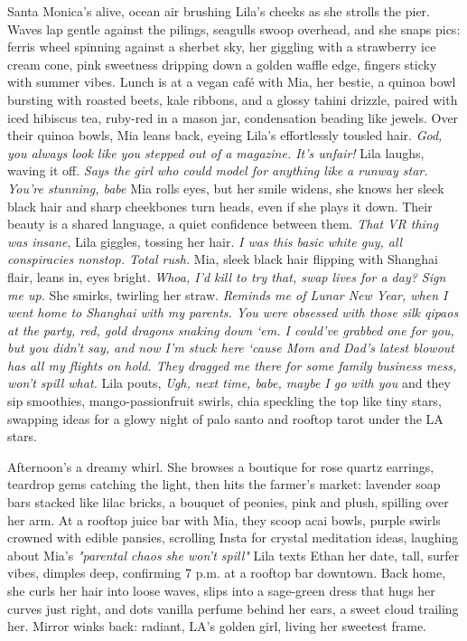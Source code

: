 \documentclass[12pt,oneside]{book} %
\begin{document}
Santa Monica’s alive, ocean air brushing Lila’s cheeks as she strolls the pier. Waves lap gentle against the pilings, seagulls swoop overhead, and she snaps pics: ferris wheel spinning against a sherbet sky, her giggling with a strawberry ice cream cone, pink sweetness dripping down a golden waffle edge, fingers sticky with summer vibes. Lunch is at a vegan café with Mia, her bestie, a quinoa bowl bursting with roasted beets, kale ribbons, and a glossy tahini drizzle, paired with iced hibiscus tea, ruby-red in a mason jar, condensation beading like jewels. Over their quinoa bowls, Mia leans back, eyeing Lila’s effortlessly tousled hair. \textit{God, you always look like you stepped out of a magazine. It’s unfair!} Lila laughs, waving it off. \textit{Says the girl who could model for anything like a runway star. You’re stunning, babe} Mia rolls eyes, but her smile widens, she knows her sleek black hair and sharp cheekbones turn heads, even if she plays it down. Their beauty is a shared language, a quiet confidence between them. \textit{That VR thing was insane}, Lila giggles, tossing her hair. \textit{I was this basic white guy, all conspiracies nonstop. Total rush.} Mia, sleek black hair flipping with Shanghai flair, leans in, eyes bright. \textit{Whoa, I’d kill to try that, swap lives for a day? Sign me up.} She smirks, twirling her straw. \textit{Reminds me of Lunar New Year, when I went home to Shanghai with my parents. You were obsessed with those silk qipaos at the party, red, gold dragons snaking down ‘em. I could’ve grabbed one for you, but you didn’t say, and now I’m stuck here ‘cause Mom and Dad’s latest blowout has all my flights on hold. They dragged me there for some family business mess, won’t spill what.} Lila pouts, \textit{Ugh, next time, babe, maybe I go with you} and they sip smoothies, mango-passionfruit swirls, chia speckling the top like tiny stars, swapping ideas for a glowy night of palo santo and rooftop tarot under the LA stars.

Afternoon’s a dreamy whirl. She browses a boutique for rose quartz earrings, teardrop gems catching the light, then hits the farmer’s market: lavender soap bars stacked like lilac bricks, a bouquet of peonies, pink and plush, spilling over her arm. At a rooftop juice bar with Mia, they scoop acai bowls, purple swirls crowned with edible pansies, scrolling Insta for crystal meditation ideas, laughing about Mia’s \textit{"parental chaos she won’t spill"} Lila texts Ethan her date, tall, surfer vibes, dimples deep, confirming 7 p.m. at a rooftop bar downtown. Back home, she curls her hair into loose waves, slips into a sage-green dress that hugs her curves just right, and dots vanilla perfume behind her ears, a sweet cloud trailing her. Mirror winks back: radiant, LA’s golden girl, living her sweetest frame.
\end{document}
